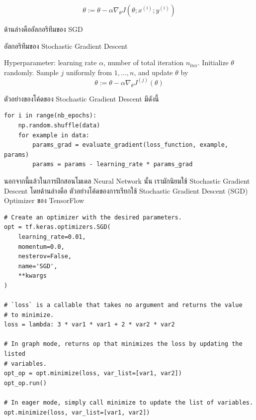 \begin{equation}\label{eq:sgd}
    \theta := \theta - \alpha\nabla_\theta J( \theta; x^{(i)}; y^{(i)})
\end{equation}

\noindent ด้านล่างคืออัลกอริทึมของ SGD

\begin{algorithm}[ht]
    \caption{อัลกอริทึมของ Stochastic Gradient Descent}
    \label{alg:sgd}
    \begin{algorithmic}
    \State Hyperparameter: learning rate $\alpha$, number of total iteration $n_\text{iter}$.
    \State Initialize $\theta$ randomly.
        \State Sample $j$ uniformly from ${1,\ldots,n}$, and update $\theta$ by
        \begin{equation*}
            \theta := \theta - \alpha\nabla_\theta J^{(j)}(\theta)
        \end{equation*}
    \EndFor
    \end{algorithmic}
\end{algorithm}

\noindent ตัวอย่างของโค้ดของ Stochastic Gradient Descent มีดังนี้

\begin{lstlisting}[style=MyPython]
for i in range(nb_epochs):
    np.random.shuffle(data)
    for example in data:
        params_grad = evaluate_gradient(loss_function, example, params)
        params = params - learning_rate * params_grad
\end{lstlisting}

\noindent นอกจากนี้แล้วในการฝึกสอนโมเดล Neural Network นั้น เรามักนิยมใช้ Stochastic Gradient Descent โดยด้านล่างคือ%
ตัวอย่างโค้ดของการเรียกใช้ Stochastic Gradient Descent (SGD) Optimizer ของ TensorFlow

\begin{lstlisting}[style=MyPython]
# Create an optimizer with the desired parameters.
opt = tf.keras.optimizers.SGD(
    learning_rate=0.01,
    momentum=0.0,
    nesterov=False,
    name='SGD',
    **kwargs
)

# `loss` is a callable that takes no argument and returns the value
# to minimize.
loss = lambda: 3 * var1 * var1 + 2 * var2 * var2

# In graph mode, returns op that minimizes the loss by updating the listed
# variables.
opt_op = opt.minimize(loss, var_list=[var1, var2])
opt_op.run()

# In eager mode, simply call minimize to update the list of variables.
opt.minimize(loss, var_list=[var1, var2])
\end{lstlisting}

